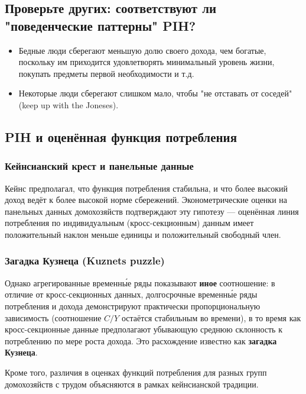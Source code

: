 \documentclass[10pt,a4paper]{article}
\begin{document}
\subsection{Проверьте других: соответствуют ли "поведенческие паттерны" PIH?}

\begin{itemize}[leftmargin=1.3em]
\item Бедные люди сберегают меньшую долю своего дохода, чем богатые, поскольку им приходится удовлетворять минимальный уровень жизни, покупать предметы первой необходимости и т.д.
\item Некоторые люди сберегают слишком мало, чтобы "не отставать от соседей" (keep up with the Joneses).
\end{itemize}

\subsection{PIH и оценённая функция потребления}

\subsubsection{Кейнсианский крест и панельные данные}

Кейнс предполагал, что функция потребления стабильна, и что более высокий доход ведёт к более высокой норме сбережений. Эконометрические оценки на панельных данных домохозяйств подтверждают эту гипотезу — оценённая линия потребления по индивидуальным (кросс-секционным) данным имеет положительный наклон меньше единицы и положительный свободный член.

\subsubsection{Загадка Кузнеца (Kuznets puzzle)}

Однако агрегированные временны́е ряды показывают \textbf{иное} соотношение: в отличие от кросс-секционных данных, долгосрочные временны́е ряды потребления и дохода демонстрируют практически пропорциональную зависимость (соотношение $C/Y$ остаётся стабильным во времени), в то время как кросс-секционные данные предполагают убывающую среднюю склонность к потреблению по мере роста дохода. Это расхождение известно как \textbf{загадка Кузнеца}.

Кроме того, различия в оценках функций потребления для разных групп домохозяйств с трудом объясняются в рамках кейнсианской традиции.
\end{document}
